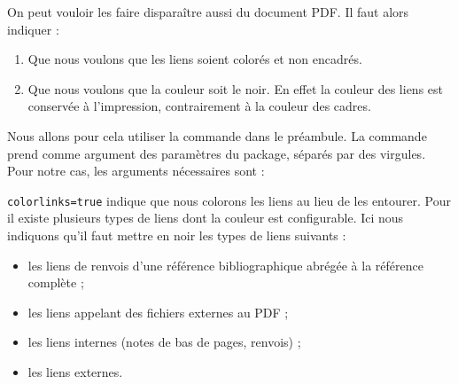 On peut vouloir les faire disparaître aussi du document PDF. Il faut alors indiquer :
\begin{enumerate}
\item Que nous voulons que les liens soient colorés et non encadrés.
\item Que nous voulons que la couleur soit le noir. En effet la couleur des liens est conservée à l'impression, contrairement à la couleur des cadres.
\end{enumerate}

Nous allons pour cela utiliser la commande  dans le préambule. La commande prend comme argument des paramètres du package, séparés par des virgules.
Pour notre cas, les arguments nécessaires sont :

\begin{latexcode}
\hypersetup{colorlinks=true,
citecolor=black,
filecolor=black,
linkcolor=black,
urlcolor=black}
\end{latexcode}

\verb|colorlinks=true| indique que nous colorons les liens au lieu de les entourer. Pour  il existe plusieurs types de liens dont la couleur est configurable. Ici nous indiquons qu'il faut mettre en noir les types de liens suivants  :\begin{itemize}
\item les liens de renvois d'une référence bibliographique abrégée à la référence complète ;
\item les liens appelant des fichiers externes au PDF ;
\item les liens internes (notes de bas de pages, renvois) ;
\item les liens externes.
\end{itemize}
